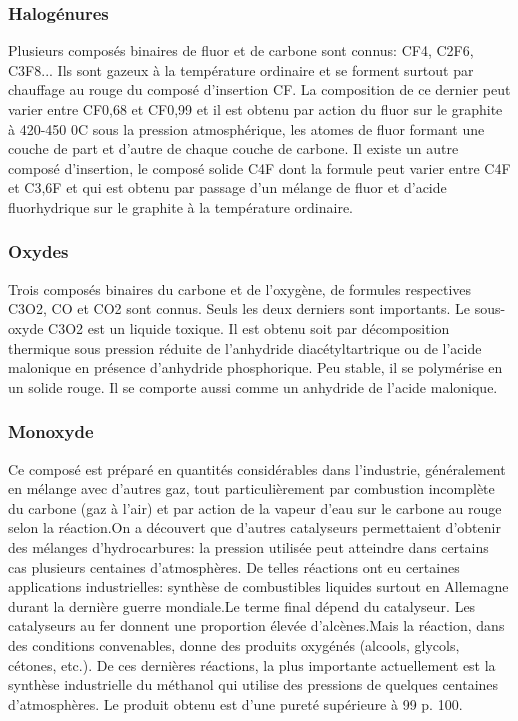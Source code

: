 \documentclass[]{article}
\begin{document}
\subsubsection{Halogénures}

Plusieurs composés binaires de fluor et de carbone sont connus:
CF4, C2F6, C3F8... Ils sont gazeux à la température ordinaire et
se forment surtout par chauffage au rouge du composé d'insertion
CF. La composition de ce dernier peut varier entre CF0,68 et CF0,99 et
il est obtenu par action du fluor sur le graphite à 420-450 0C
sous la pression atmosphérique, les atomes de fluor formant une
couche de part et d'autre de chaque couche de carbone. Il existe un
autre composé d'insertion, le composé solide C4F dont la formule
peut varier entre C4F et C3,6F et qui est obtenu par passage d'un
mélange de fluor et d'acide fluorhydrique sur le graphite à la
température ordinaire.  

\subsubsection{Oxydes} 

Trois composés binaires du carbone et de l'oxygène, de formules
respectives C3O2, CO et CO2 sont connus. Seuls les deux derniers sont
importants. Le sous-oxyde C3O2 est un liquide toxique. Il est obtenu
soit par décomposition thermique sous pression réduite de
l'anhydride diacétyltartrique ou de l'acide malonique en
présence d'anhydride phosphorique. Peu stable, il se polymérise
en un solide rouge. Il se comporte aussi comme un anhydride de l'acide
malonique.

\subsubsection{Monoxyde} 

Ce composé est préparé en quantités considérables dans
l'industrie, généralement en mélange avec d'autres gaz, tout
particulièrement par combustion incomplète du carbone (gaz à
l'air) et par action de la vapeur d'eau sur le carbone au rouge selon
la réaction.On a découvert que d'autres catalyseurs permettaient
d'obtenir des mélanges d'hydrocarbures: la pression utilisée
peut atteindre dans certains cas plusieurs centaines
d'atmosphères. De telles réactions ont eu certaines applications
industrielles: synthèse de combustibles liquides surtout en
Allemagne durant la dernière guerre mondiale.Le terme final
dépend du catalyseur. Les catalyseurs au fer donnent une proportion
élevée d'alcènes.Mais la réaction, dans des conditions
convenables, donne des produits oxygénés (alcools, glycols,
cétones, etc.). De ces dernières réactions, la plus
importante actuellement est la synthèse industrielle du méthanol
qui utilise des pressions de quelques centaines d'atmosphères. Le
produit obtenu est d'une pureté supérieure à 99 p. 100.
\end{document}
